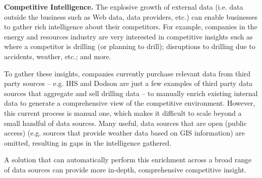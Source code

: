 \textbf{Competitive Intelligence.} The explosive growth of external data (i.e. data outside the business such as Web
data, data providers, etc.) can enable businesses to gather rich intelligence about their competitors. For example,
companies in the energy and resources industry are very interested in competitive insights such as where a competitor
is drilling (or planning to drill); disruptions to drilling due to accidents, weather, etc.; and more.

To gather these insights, companies currently purchase relevant data from third party sources -- e.g. IHS and Dodson
are just a few examples of third party data sources that aggregate and sell drilling data -- to manually enrich
existing internal data to generate a comprehensive view of the competitive environment. However, this current
process is manual one, which makes it difficult to scale beyond a small handful of data sources. Many useful,
data sources that are open (public access) (e.g. sources that provide weather data based on GIS information) are omitted,
resulting in gaps in the intelligence gathered.

A solution that can automatically perform this enrichment across a broad range of data sources can provide more
in-depth, comprehensive competitive insight.


